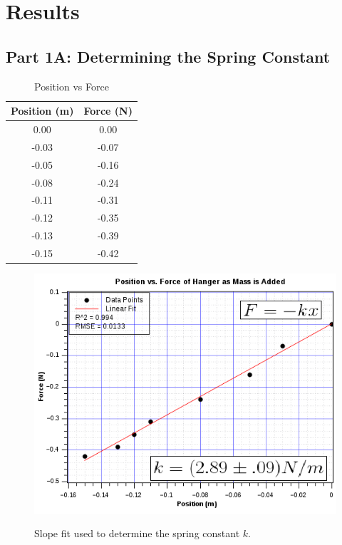 \documentclass[twocolumn,english]{IEEEtran}
\theoremstyle{plain}
\theoremstyle{plain}
\begin{document}
\section{Results}
\subsection*{\textbf{Part 1A: Determining the Spring Constant}}
\begin{table}[h]
\caption{Position vs Force}
\label{tb:data_determining_k}
\centering{}
\begin{tabular}{|c|c|}
\hline
\textbf{Position (m)} & \textbf{Force (N)} \\ \hline
0.00                  & 0.00               \\ \hline
-0.03                 & -0.07              \\ \hline
-0.05                 & -0.16              \\ \hline
-0.08                 & -0.24              \\ \hline
-0.11                 & -0.31              \\ \hline
-0.12                 & -0.35              \\ \hline
-0.13                 & -0.39              \\ \hline
-0.15                 & -0.42              \\ \hline
\end{tabular}
\end{table}

\begin{figure}[h!]
  \begin{centering}
  \begin{center}
  \includegraphics[width=\linewidth]{./graph1a.png}
  \label{fig:graph_spring_const}
  \caption{Slope fit used to determine the spring constant $k$.}
  \end{center}
  \par\end{centering}
  \end{figure}
\end{document}
